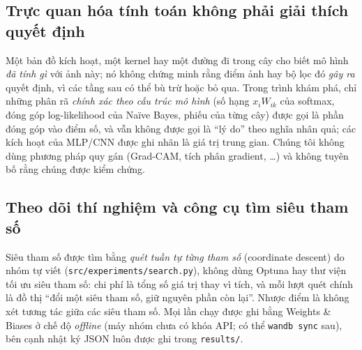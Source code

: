 \subsection{Trực quan hóa tính toán không phải giải thích quyết định}
\label{sec:viz-vs-explain}
Một bản đồ kích hoạt, một kernel hay một đường đi trong cây cho biết mô hình \emph{đã tính gì} với ảnh này; nó không chứng minh rằng điểm ảnh hay bộ lọc đó \emph{gây ra} quyết định, vì các tầng sau có thể bù trừ hoặc bỏ qua. Trong trình khám phá, chỉ những phân rã \emph{chính xác theo cấu trúc mô hình} (số hạng $x_iW_{ik}$ của softmax, đóng góp log-likelihood của Naïve Bayes, phiếu của từng cây) được gọi là phần đóng góp vào điểm số, và vẫn không được gọi là ``lý do'' theo nghĩa nhân quả; các kích hoạt của MLP/CNN được ghi nhãn là giá trị trung gian. Chúng tôi không dùng phương pháp quy gán (Grad-CAM, tích phân gradient, \ldots) và không tuyên bố rằng chúng được kiểm chứng.

\subsection{Theo dõi thí nghiệm và công cụ tìm siêu tham số}
Siêu tham số được tìm bằng \emph{quét tuần tự từng tham số} (coordinate descent) do nhóm tự viết (\texttt{src/experiments/search.py}), không dùng Optuna hay thư viện tối ưu siêu tham số: chi phí là tổng số giá trị thay vì tích, và mỗi lượt quét chính là đồ thị ``đổi một siêu tham số, giữ nguyên phần còn lại''. Nhược điểm là không xét tương tác giữa các siêu tham số. Mọi lần chạy được ghi bằng Weights \& Biases ở chế độ \emph{offline} (máy nhóm chưa có khóa API; có thể \texttt{wandb sync} sau), bên cạnh nhật ký JSON luôn được ghi trong \texttt{results/}.

